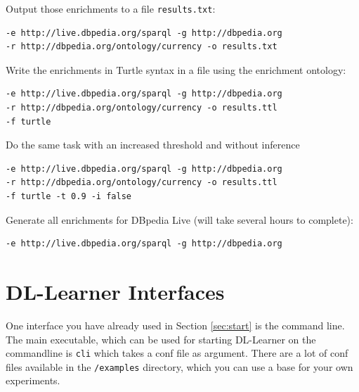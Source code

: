 \documentclass[a4paper,12pt]{scrartcl}
\newcommand{\todo}[1]{\textbf{[ToDo: #1]}}
\begin{document}
Output those enrichments to a file \verb|results.txt|:
\begin{verbatim}
-e http://live.dbpedia.org/sparql -g http://dbpedia.org 
-r http://dbpedia.org/ontology/currency -o results.txt
\end{verbatim}

Write the enrichments in Turtle syntax in a file using the enrichment ontology:
\begin{verbatim}
-e http://live.dbpedia.org/sparql -g http://dbpedia.org 
-r http://dbpedia.org/ontology/currency -o results.ttl
-f turtle
\end{verbatim}

Do the same task with an increased threshold and without inference

\begin{verbatim}
-e http://live.dbpedia.org/sparql -g http://dbpedia.org 
-r http://dbpedia.org/ontology/currency -o results.ttl
-f turtle -t 0.9 -i false
\end{verbatim}

Generate all enrichments for DBpedia Live (will take several hours to complete):
\begin{verbatim}
-e http://live.dbpedia.org/sparql -g http://dbpedia.org 
\end{verbatim}


\section{DL-Learner Interfaces}



One interface you have already used in Section \ref{sec:start} is the command line. The main executable, which can be used for starting DL-Learner on the commandline is \verb|cli| which takes a conf file as argument. There are a lot of conf files available in the \verb|/examples| directory, which you can use a base for your own experiments.

\end{document}
